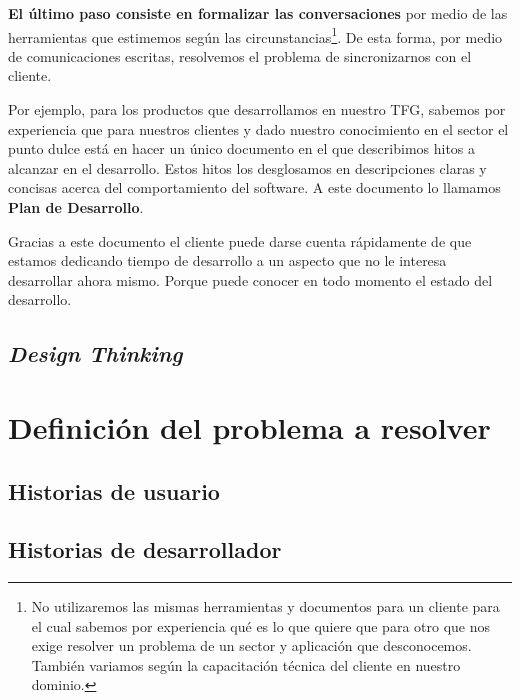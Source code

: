 \textbf{El último paso consiste en formalizar las conversaciones} por medio de las
herramientas que estimemos según las circunstancias\footnote{%
    No utilizaremos las mismas herramientas y documentos para un cliente para el cual
    sabemos por experiencia qué es lo que quiere que para otro que nos exige resolver
    un problema de un sector y aplicación que desconocemos. También variamos según
    la capacitación técnica del cliente en nuestro dominio.
}. De esta forma, por medio de comunicaciones escritas, resolvemos el problema de
sincronizarnos con el cliente.

Por ejemplo, para los productos que desarrollamos en nuestro TFG, sabemos por experiencia
que para nuestros clientes y dado nuestro conocimiento en el sector el punto dulce está
en hacer un único documento en el que describimos hitos a alcanzar en el desarrollo.
Estos hitos los desglosamos en descripciones claras y concisas acerca del comportamiento del software.
A este documento lo llamamos \textbf{Plan de Desarrollo}.

Gracias a este documento el cliente puede darse
cuenta rápidamente de que estamos dedicando tiempo de desarrollo a un aspecto que no le
interesa desarrollar ahora mismo. Porque puede conocer en todo momento el estado del desarrollo.

\subsection{\textit{Design Thinking}}


\section{Definición del problema a resolver}

\subsection{Historias de usuario}


\subsection{Historias de desarrollador}

